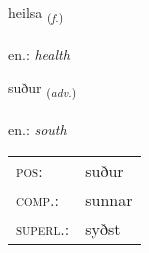 \documentclass[frontgrid, backgrid]{flacards}\usepackage[]{graphicx}\usepackage[]{xcolor}
\begin{document}
\renewcommand{\flhead}{\vskip5pt \fboxsep=0pt {\small\bfseries\footnotesize Nafnorð | Noun}}
\renewcommand{\fcfoot}{\vskip5pt \fboxsep=0pt \hspace{2pt}{\small\bfseries\footnotesize 2K}}

\renewcommand{\blhead}{\vskip5pt {\small\bfseries\footnotesize Nafnorð | Noun }}
\renewcommand{\bcfoot}{\vskip5pt \hspace{2pt}{\small\bfseries\footnotesize 2K}}


{heilsa \small{\textsubscript{(\textit{f.})}} \\[1ex] %
\textphonetic{[heilsa]} \\
en.: \emph{health} \\  [2ex]
\renewcommand*{\arraystretch}{0.8}
}

\renewcommand{\flhead}{\vskip5pt \fboxsep=0pt {\small\bfseries\footnotesize Atviksorð | Adverb}}
\renewcommand{\fcfoot}{\vskip5pt \fboxsep=0pt \hspace{2pt}{\small\bfseries\footnotesize 2K}}

\renewcommand{\blhead}{\vskip5pt {\small\bfseries\footnotesize Atviksorð | Adverb }}
\renewcommand{\bcfoot}{\vskip5pt \hspace{2pt}{\small\bfseries\footnotesize 2K}}


{suður \small{\textsubscript{(\textit{adv.})}} \\[1ex] %
\textphonetic{[sʏːðʏr]} \\
en.: \emph{south} \\  [2ex]
\renewcommand*{\arraystretch}{0.8}
\begin{tabular}{ll}
\textsc{pos}: & suður \\ 
\textsc{comp.}: & sunnar \\ 
\textsc{superl.}: & syðst \\
\end{tabular}
}
\end{document}
